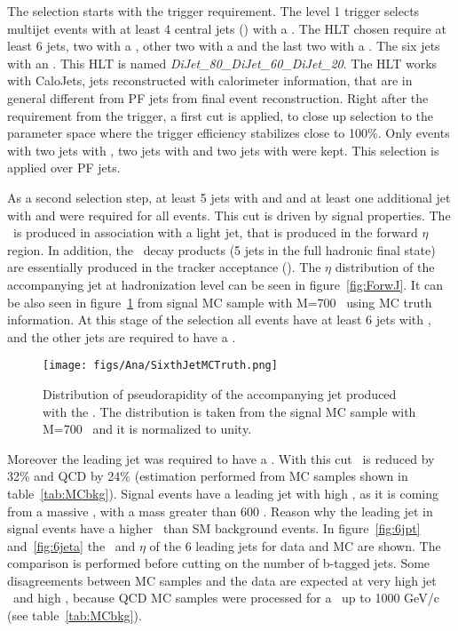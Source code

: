 The selection starts with the trigger requirement. The level 1 trigger selects multijet events  with at least 4 central jets () with a . The HLT chosen require at least 6 jets, two with a , other two with a  and the last two with a . The six jets with an . This HLT is named \textit{DiJet\_80\_DiJet\_60\_DiJet\_20}. The HLT works with CaloJets, jets reconstructed with calorimeter information, that are in general different from PF jets from final event reconstruction. Right after the requirement from the trigger, a first cut is applied, to close up selection to the parameter space where the trigger efficiency stabilizes close to 100\%. Only events with two jets with , two jets with  and two jets with  were kept. This selection is applied over PF jets. %

As a second selection step, at least 5 jets with  and  and at least one additional jet with  and  were required for all events. This cut is driven by signal properties. The \Tp~is produced in association with a light jet, that is produced in the forward $\eta$ region. In addition, the \Tp~decay products (5 jets in the full hadronic final state) are essentially produced in the tracker acceptance (). The $\eta$ distribution of the accompanying jet at hadronization level can be seen in figure~\ref{fig:ForwJ}. It can be also seen in figure~\ref{fig:SixthJetTp} from signal MC sample with M=700 \GeVcc~using MC truth information. At this stage of the selection all events have at least 6 jets with , and the other jets are required to have a . %

\begin{figure}[!Hhtbp]
  \begin{center}
    \texttt{[image: figs/Ana/SixthJetMCTruth.png]}
    \caption{Distribution of pseudorapidity of the accompanying jet produced with the \Tp. The distribution is taken from the signal MC sample with M=700 \GeVcc~and it is normalized to unity.}
    \label{fig:SixthJetTp}
  \end{center}
\end{figure}

Moreover the leading jet was required to have a . With this cut \ttbar~is reduced by 32\% and QCD by 24\% (estimation performed from MC samples shown in table~\ref{tab:MCbkg}). Signal events have a leading jet with high \pt, as it is coming from a massive \Tp, with a mass greater than 600 \GeVcc. Reason why the leading jet in signal events have a higher \pt~than SM background events. In figure~\ref{fig:6jpt} and~\ref{fig:6jeta} the \pt~and $\eta$ of the 6 leading jets for data and MC are shown. The comparison is performed before cutting on the number of b-tagged jets. Some disagreements between MC samples and the data are expected at very high jet \pt~and high \HT, because QCD MC samples were processed for a \pt~up to 1000 GeV/c (see table~\ref{tab:MCbkg}). 

